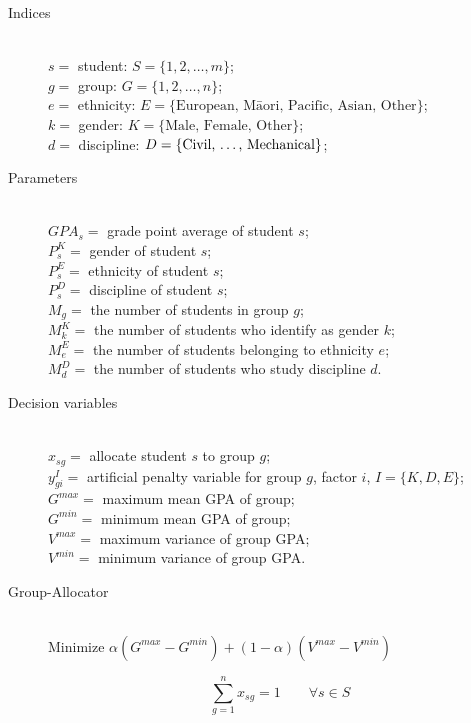 \documentclass[12pt]{ORSNZ}
\begin{document}
\begin{description}
\item[Indices] \mbox{}\\
        $s =$ student: $S = \{1, 2, \dots, m\}$;\\
        $g =$ group: $G = \{1, 2, \dots, n\}$;\\
        $e =$ ethnicity: $E = \{\mbox{European, M\=aori, Pacific, Asian, Other}\}$;\\
        $k =$ gender: $K = \{\mbox{Male, Female, Other}\}$;\\
        $d =$ discipline: $D = \{\mbox{Civil, \dots, Mechanical}\}$;\\


\item[Parameters] \mbox{} \\
$GPA_s = $ grade point average of student $s$; \\
$P^K_s = $ gender of student $s$; \\
$P^E_s = $ ethnicity of student $s$; \\
$P^D_s = $ discipline of student $s$; \\
$M_g = $ the number of students in group $g$;\\
$M^K_k = $ the number of students who identify as gender $k$;\\
$M^E_e = $ the number of students belonging to ethnicity $e$;\\
$M^D_d = $ the number of students who study discipline $d$.


\item[Decision variables]\mbox{} \\
$x_{sg} = $ allocate student $s$ to group $g$;\\
$y^I_{gi} = $ artificial penalty variable for group $g$, factor $i$, \qquad $I=\{K, D, E\}$;\\

$G^{max} = $ maximum mean GPA of group;\\
$G^{min} = $ minimum mean GPA of group;\\
$V^{max} = $ maximum variance of group GPA;\\
$V^{min} = $  minimum variance of group GPA.


\item[Group-Allocator]\mbox{} \\
Minimize $\alpha (G^{max} - G^{min}) + (1-\alpha)(V^{max} - V^{min})$

\begin{equation} \label{con1}
\sum_{g=1}^n x_{sg} =  1 \qquad \mbox{$\forall s \in S$}
\end{equation}


\end{description}
\end{document}
